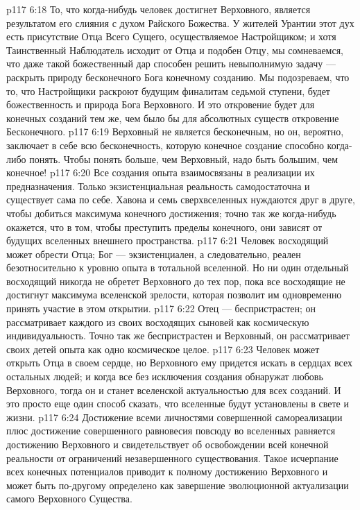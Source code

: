 \vs p117 6:18 То, что когда\hyp{}нибудь человек достигнет Верховного, является результатом его слияния с духом Райского Божества. У жителей Урантии этот дух есть присутствие Отца Всего Сущего, осуществляемое Настройщиком; и хотя Таинственный Наблюдатель исходит от Отца и подобен Отцу, мы сомневаемся, что даже такой божественный дар способен решить невыполнимую задачу --- раскрыть природу бесконечного Бога конечному созданию. Мы подозреваем, что то, что Настройщики раскроют будущим финалитам седьмой ступени, будет божественность и природа Бога Верховного. И это откровение будет для конечных созданий тем же, чем было бы для абсолютных существ откровение Бесконечного.
\vs p117 6:19 Верховный не является бесконечным, но он, вероятно, заключает в себе всю бесконечность, которую конечное создание способно когда\hyp{}либо понять. Чтобы понять больше, чем Верховный, надо быть большим, чем конечное!
\vs p117 6:20 Все создания опыта взаимосвязаны в реализации их предназначения. Только экзистенциальная реальность самодостаточна и существует сама по себе. Хавона и семь сверхвселенных нуждаются друг в друге, чтобы добиться максимума конечного достижения; точно так же когда\hyp{}нибудь окажется, что в том, чтобы преступить пределы конечного, они зависят от будущих вселенных внешнего пространства.
\vs p117 6:21 Человек восходящий может обрести Отца; Бог --- экзистенциален, а следовательно, реален безотносительно к уровню опыта в тотальной вселенной. Но ни один отдельный восходящий никогда не обретет Верховного до тех пор, пока все восходящие не достигнут максимума вселенской зрелости, которая позволит им одновременно принять участие в этом открытии.
\vs p117 6:22 Отец --- беспристрастен; он рассматривает каждого из своих восходящих сыновей как космическую индивидуальность. Точно так же беспристрастен и Верховный, он рассматривает своих детей опыта как одно космическое целое.
\vs p117 6:23 Человек может открыть Отца в своем сердце, но Верховного ему придется искать в сердцах всех остальных людей; и когда все без исключения создания обнаружат любовь Верховного, тогда он и станет вселенской актуальностью для всех созданий. И это просто еще один способ сказать, что вселенные будут установлены в свете и жизни.
\vs p117 6:24 Достижение всеми личностями совершенной самореализации плюс достижение совершенного равновесия повсюду во вселенных равняется достижению Верховного и свидетельствует об освобождении всей конечной реальности от ограничений незавершенного существования. Такое исчерпание всех конечных потенциалов приводит к полному достижению Верховного и может быть по\hyp{}другому определено как завершение эволюционной актуализации самого Верховного Существа.
